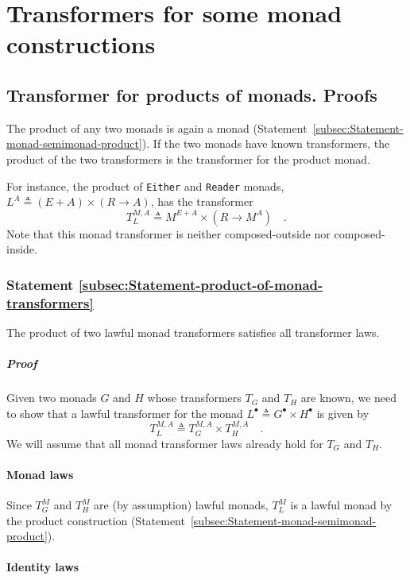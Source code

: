 \section{Transformers for some monad constructions}

\subsection{Transformer for products of monads. Proofs}

The product of any two monads is again a monad (Statement~\ref{subsec:Statement-monad-semimonad-product}).
If the two monads have known transformers, the product of the two
transformers is the transformer for the product monad. 

For instance, the product of \lstinline!Either! and \lstinline!Reader!
monads, $L^{A}\triangleq(E+A)\times(R\rightarrow A)$, has the transformer
\[
T_{L}^{M,A}\triangleq M^{E+A}\times(R\rightarrow M^{A})\quad.
\]
Note that this monad transformer is neither composed-outside nor composed-inside.

\subsubsection{Statement \label{subsec:Statement-product-of-monad-transformers}\ref{subsec:Statement-product-of-monad-transformers}}

The product of two lawful monad transformers satisfies all transformer
laws.

\subparagraph{Proof}

Given two monads $G$ and $H$ whose transformers $T_{G}$ and $T_{H}$
are known, we need to show that a lawful transformer for the monad
$L^{\bullet}\triangleq G^{\bullet}\times H^{\bullet}$ is given by
\[
T_{L}^{M,A}\triangleq T_{G}^{M,A}\times T_{H}^{M,A}\quad.
\]
We will assume that all monad transformer laws already hold for $T_{G}$
and $T_{H}$.

\paragraph{Monad laws}

Since $T_{G}^{M}$ and $T_{H}^{M}$ are (by assumption) lawful monads,
$T_{L}^{M}$ is a lawful monad by the product construction (Statement~\ref{subsec:Statement-monad-semimonad-product}).

\paragraph{Identity laws}

